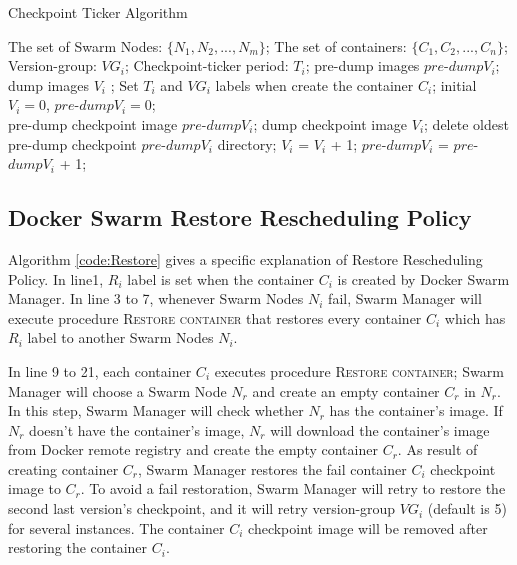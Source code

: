 \begin{algorithm}[h]
    \caption{Checkpoint Ticker Algorithm}
    \label{code:checkpointTicker}
    \begin{algorithmic}[1]
	\Require
		The set of Swarm Nodes: $\lbrace N_1,N_2,...,N_m \rbrace $;
		The set of containers: $\lbrace C_1,C_2,...,C_n \rbrace$;
		Version-group: $ VG_i $;
		Checkpoint-ticker period: $ T_i $;
	\Ensure
		pre-dump images $ pre$-$dump V_i $; dump images $ V_i $ ;
        \State Set $ T_i $ and $ VG_i $ labels when create the container $ C_i $;
        \State initial $ V_i=0 $, $ pre$-$dump V_i=0 $;
        \\
					\State pre-dump checkpoint image $ pre $-$ dump V_i $;
				\EndIf
			\State dump checkpoint image $ V_i $;
                	\State delete oldest pre-dump checkpoint $ pre $-$ dump V_i $ directory;
				\EndIf
            	\State $ V_i $ = $ V_ i$ + 1;
          	      \State $ pre $-$ dump V_i $ = $ pre $-$ dump V_i $ + 1;
        	    \EndIf
     	   \EndWhile
        \EndFor
    \end{algorithmic}
\end{algorithm}

\subsection{Docker Swarm Restore Rescheduling Policy}
Algorithm \ref{code:Restore} gives a specific explanation of Restore Rescheduling Policy. In line1, $ R_i $ label is set when the container $C_i$ is created by Docker Swarm Manager.
In line 3 to 7, whenever Swarm Nodes $ N_i $ fail, Swarm Manager will execute procedure \textsc{Restore container} that restores every container $ C_i $ which has $ R_i $ label to another Swarm Nodes $ N_i $.

In line 9 to 21, each container $ C_i $ executes procedure \textsc{Restore container}; Swarm Manager will choose a Swarm Node $ N_r $ and create an empty container $ C_r $ in $ N_r $. In this step, Swarm Manager will check whether $ N_r $ has the container's image. If $ N_r $ doesn't have the container's image, $ N_r $ will download the container's image from Docker remote registry and create the empty container $ C_r $.
As result of creating container $ C_r $, Swarm Manager restores the fail container $ C_i $ checkpoint image to $ C_r $. To avoid a fail restoration, Swarm Manager will retry to restore the second last version's checkpoint, and it will retry version-group $ VG_i $ (default is 5) for several instances. The container $ C_i $ checkpoint image will be removed after restoring the container  $ C_i $.

